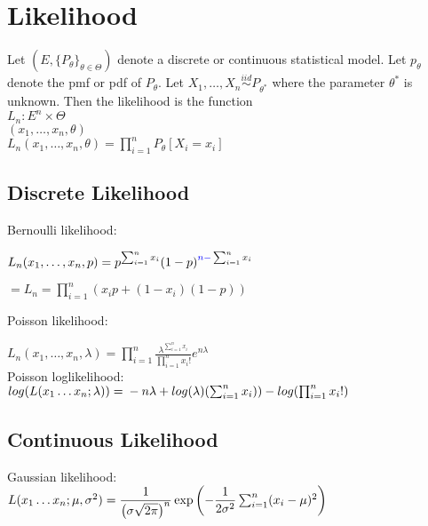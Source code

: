 \section{Likelihood}

Let $(E, \{ P_\theta \} _{\theta \in \Theta })$ denote a discrete or continuous statistical model. Let $p_\theta$ denote the pmf or pdf of $P_\theta$. Let $X_1, \ldots , X_ n \stackrel{iid}{\sim } P_{\theta ^*}$ where the parameter $\theta ^*$  is unknown. Then the likelihood is the function \\

$\displaystyle  L_ n: E^ n \times \Theta$\\
$\displaystyle (x_1, \ldots , x_ n, \theta )$\\
$L_ n(x_1, \ldots , x_ n, \theta) = \prod _{i = 1}^ n P_{\theta}[X_i=x_i] $\\

\subsection*{Discrete Likelihood}

Bernoulli likelihood:

$L_ n(x_1, \ldots , x_ n, p) = p^{\sum _{i = 1}^ n x_ i} (1 -p)^{{\color{blue}{n - }} \sum _{i = 1}^ n x_ i}$

$= L_ n = \prod _{i = 1}^ n \left( x_ i p + (1 - x_ i) (1 - p) \right)$

Poisson likelihood:

$L_ n(x_1, \ldots , x_ n, \lambda) = \prod _{i = 1}^ n \frac{\lambda^{\sum_{i=1}^{n} x_i}}{\prod _{i = 1}^ n x_i!} e^{n\lambda}$\\

Poisson loglikelihood:\\
$log(L(x_1\dots x_n;\lambda))= \\ -n\lambda + log(\lambda)(\sum_{i=1}^n x_i)) - log(\prod _{i = 1}^ n x_i!)$


\subsection*{Continuous Likelihood}

Gaussian likelihood:\\

$L(x_1\dots x_n;\mu,\sigma^2)=\\ \dfrac{1}{\left(\sigma\sqrt{2\pi}\right)^n}\exp{\left(-\dfrac{1}{2\sigma^2}\sum_{i=1}^n (x_i-\mu)^2 \right)}$\\

